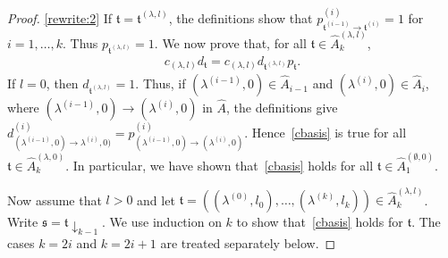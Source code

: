 \documentclass[11pt,a4paper,reqno,svgnames]{amsart}
\theoremstyle{plain}
\theoremstyle{definition}
\numberwithin{equation}{section}
\begin{document}
\begin{proof}
\eqref{rewrite:2} If  $\mathfrak{t}=\mathfrak{t}^{(\lambda,l)}$, the definitions show that $p^{(i)}_{\mathfrak{t}^{(i-1)}\to\mathfrak{t}^{(i)}}=1$ for $i=1,\ldots,k$. Thus $p_{\mathfrak{t}^{(\lambda,l)}}=1$. We now prove that, for all $\mathfrak{t}\in\hat{A}_k^{(\lambda,l)}$, 
\begin{align}\label{cbasis} c_{(\lambda,l)}d_\mathfrak{t} =c_{(\lambda,l)}d_{\mathfrak{t}^{(\lambda,l)}}p_\mathfrak{t}.
\end{align}
If $l=0$, then $d_{\mathfrak{t}^{(\lambda,l)}}=1$. Thus, if $(\lambda^{(i-1)},0)\in\hat{A}_{i-1}$ and $(\lambda^{(i)},0)\in\hat{A}_i$, where $(\lambda^{(i-1)},0)\to (\lambda^{(i)},0)$ in $\hat{A}$, the definitions give $d_{(\lambda^{(i-1)},0)\to \lambda^{(i)},0)}^{(i)}= p_{(\lambda^{(i-1)},0)\to (\lambda^{(i)},0)}^{(i)}$. Hence~\eqref{cbasis} is true for all $\mathfrak{t}\in\hat{A}_k^{(\lambda,0)}$. In particular, we have shown that~\eqref{cbasis} holds for all $\mathfrak{t}\in\hat{A}_1^{(\emptyset,0)}$. 

Now assume that $l>0$ and let $\mathfrak{t}=((\lambda^{(0)},l_0),\ldots,(\lambda^{(k)},l_k)) \in\hat{A}_k^{(\lambda,l)}$. Write  $\mathfrak{s} =\mathfrak{t}\downarrow_{k-1}$. We use induction on $k$ to show that~\eqref{cbasis} holds for $\mathfrak{t}$. The cases $k=2i$ and $k=2i+1$ are treated separately below. 


\end{proof}
\end{document}
